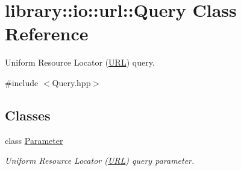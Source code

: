 \hypertarget{classlibrary_1_1io_1_1url_1_1_query}{}\section{library\+:\+:io\+:\+:url\+:\+:Query Class Reference}
\label{classlibrary_1_1io_1_1url_1_1_query}


Uniform Resource Locator (\hyperlink{classlibrary_1_1io_1_1_u_r_l}{U\+RL}) query.  




{\ttfamily \#include $<$Query.\+hpp$>$}

\subsection*{Classes}
\begin{DoxyCompactItemize}
\item 
class \hyperlink{classlibrary_1_1io_1_1url_1_1_query_1_1_parameter}{Parameter}
\begin{DoxyCompactList}\small\item\em Uniform Resource Locator (\hyperlink{classlibrary_1_1io_1_1_u_r_l}{U\+RL}) query parameter. \end{DoxyCompactList}\end{DoxyCompactItemize}
